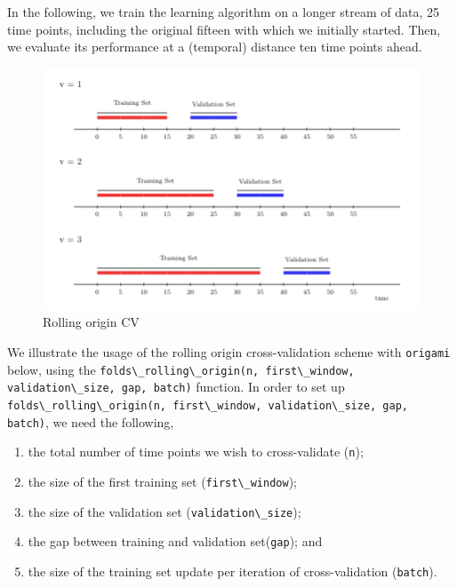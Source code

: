 \documentclass[
  12pt, krantz2,
]{krantz}
\newcommand{\passthrough}[1]{#1}
\providecommand{\tightlist}{%
  \setlength{\itemsep}{0pt}\setlength{\parskip}{0pt}}
\newcommand{\1}{\mathbbm{1}}
\theoremstyle{definition}
\theoremstyle{definition}
\theoremstyle{definition}
\theoremstyle{definition}
\theoremstyle{remark}
\begin{document}
In the following, we train the learning algorithm on a longer stream of data, 25
time points, including the original fifteen with which we initially started.
Then, we evaluate its performance at a (temporal) distance ten time points
ahead.

\begin{figure}

{\centering \includegraphics[width=0.8\linewidth]{img/png/rolling_origin} 

}

\caption{Rolling origin CV}\label{fig:unnamed-chunk-1}
\end{figure}

We illustrate the usage of the rolling origin cross-validation scheme with
\passthrough{\lstinline!origami!} below, using the \passthrough{\lstinline!folds\_rolling\_origin(n, first\_window, validation\_size, gap, batch)!} function. In order to set up
\passthrough{\lstinline!folds\_rolling\_origin(n, first\_window, validation\_size, gap, batch)!}, we need
the following,

\begin{enumerate}
\def\labelenumi{\arabic{enumi}.}
\tightlist
\item
  the total number of time points we wish to cross-validate (\passthrough{\lstinline!n!});
\item
  the size of the first training set (\passthrough{\lstinline!first\_window!});
\item
  the size of the validation set (\passthrough{\lstinline!validation\_size!});
\item
  the gap between training and validation set(\passthrough{\lstinline!gap!}); and
\item
  the size of the training set update per iteration of cross-validation (\passthrough{\lstinline!batch!}).
\end{enumerate}
\end{document}
